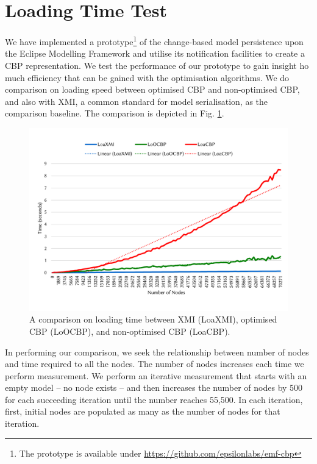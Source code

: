 \documentclass[sigconf]{acmart}
\begin{document}
\section{Loading Time Test}
\label{sec:loading_time_test}
We have implemented a prototype\footnote{The prototype is available under \url{https://github.com/epsilonlabs/emf-cbp}} of the change-based model persistence upon the Eclipse Modelling Framework and utilise its notification facilities to create a CBP representation. We test the performance of our prototype to gain insight ho much efficiency that can  be gained with the optimisation algorithms. We do comparison on loading speed between optimised CBP and non-optimised CBP, and also with XMI, a common standard for model serialisation, as the comparison baseline. The  comparison is depicted in Fig. \ref{fig:loading_speed}.

\begin{figure}[ht]
\centering
\includegraphics[width=\linewidth]{loading_speed}
\caption{A comparison on loading time between XMI (LoaXMI), optimised CBP (LoOCBP), and non-optimised CBP (LoaCBP).}
\label{fig:loading_speed}
\end{figure}

In performing our comparison, we seek the relationship between number of nodes and time required to all the nodes. The number of nodes increases each time we perform measurement. We perform an iterative measurement that starts with an empty model -- no node exists -- and then increases the number of nodes by 500 for each succeeding iteration until the number reaches 55,500. In each iteration, first, initial nodes are populated as many as the number of nodes for that iteration. 
\end{document}
